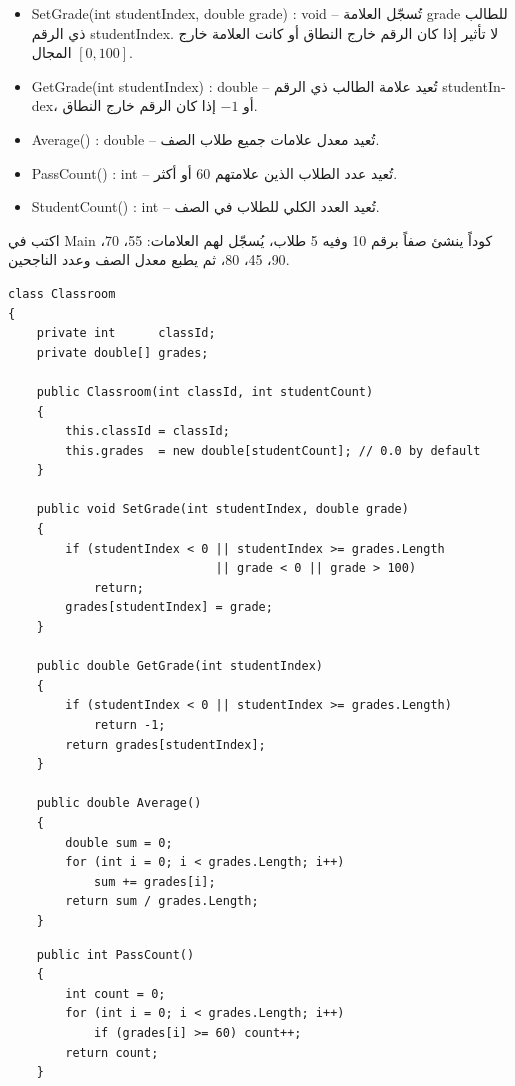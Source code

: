 \documentclass[14pt]{extarticle}
\begin{document}
\begin{enumerate}
\begin{itemize}
  \item \textenglish{SetGrade(int studentIndex, double grade) : void} --
        تُسجّل العلامة \textenglish{grade} للطالب ذي الرقم \textenglish{studentIndex}.
        لا تأثير إذا كان الرقم خارج النطاق أو كانت العلامة خارج المجال $[0, 100]$.

  \item \textenglish{GetGrade(int studentIndex) : double} --
        تُعيد علامة الطالب ذي الرقم \textenglish{studentIndex}،
        أو $-1$ إذا كان الرقم خارج النطاق.

  \item \textenglish{Average() : double} --
        تُعيد معدل علامات جميع طلاب الصف.

  \item \textenglish{PassCount() : int} --
        تُعيد عدد الطلاب الذين علامتهم 60 أو أكثر.

  \item \textenglish{StudentCount() : int} --
        تُعيد العدد الكلي للطلاب في الصف.
\end{itemize}

اكتب في \textenglish{Main} كوداً ينشئ صفاً برقم 10 وفيه 5 طلاب،
يُسجّل لهم العلامات: 55، 70، 90، 45، 80،
ثم يطبع معدل الصف وعدد الناجحين.

\ifwithsols
{\small
\begin{boxSolution}
\begin{english}
\begin{verbatim}
class Classroom
{
    private int      classId;
    private double[] grades;

    public Classroom(int classId, int studentCount)
    {
        this.classId = classId;
        this.grades  = new double[studentCount]; // 0.0 by default
    }

    public void SetGrade(int studentIndex, double grade)
    {
        if (studentIndex < 0 || studentIndex >= grades.Length
                             || grade < 0 || grade > 100)
            return;
        grades[studentIndex] = grade;
    }

    public double GetGrade(int studentIndex)
    {
        if (studentIndex < 0 || studentIndex >= grades.Length)
            return -1;
        return grades[studentIndex];
    }

    public double Average()
    {
        double sum = 0;
        for (int i = 0; i < grades.Length; i++)
            sum += grades[i];
        return sum / grades.Length;
    }
\end{verbatim}
\end{english}
\end{boxSolution}
\begin{boxSolution}
\begin{english}
\begin{verbatim}
    public int PassCount()
    {
        int count = 0;
        for (int i = 0; i < grades.Length; i++)
            if (grades[i] >= 60) count++;
        return count;
    }


\end{verbatim}
\end{english}
\end{boxSolution}}
\end{enumerate}
\end{document}
